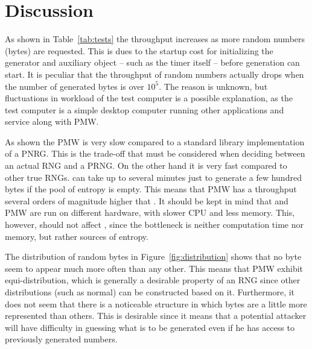 \section{Discussion}
\label{sec:discussion}
As shown in Table~\ref{tab:tests} the throughput increases as more random numbers (bytes) are requested.
This is dues to the startup cost for initializing the generator and auxiliary object -- such as the timer itself -- before generation can start.
It is peculiar that the throughput of random numbers actually drops when the number of generated bytes is over $10^5$.
The reason is unknown, but fluctuations in workload of the test computer is a possible explanation, as the test computer is a simple desktop computer running other applications and service along with PMW.

As shown the PMW is very slow compared to a standard library implementation of a PNRG.
This is the trade-off that must be considered when deciding between an actual RNG and a PRNG.
On the other hand it is very fast compared to other true RNGs.
\devrandom{} can take up to several minutes just to generate a few hundred bytes if the pool of entropy is empty.
This means that PMW has a throughput several orders of magnitude higher that \devrandom{}.
It should be kept in mind that \devrandom{} and PMW are run on different hardware, with slower CPU and less memory.
This, however, should not affect \devrandom{}, since the bottleneck is neither computation time nor memory, but rather sources of entropy.

The distribution of random bytes in Figure~\ref{fig:distribution} shows that no byte seem to appear much more often than any other.
This means that PMW exhibit equi-distribution, which is generally a desirable property of an RNG since other distributions (such as normal) can be constructed based on it.
Furthermore, it does not seem that there is a noticeable structure in which bytes are a little more represented than others.
This is desirable since it means that a potential attacker will have difficulty in guessing what is to be generated even if he has access to previously generated numbers.